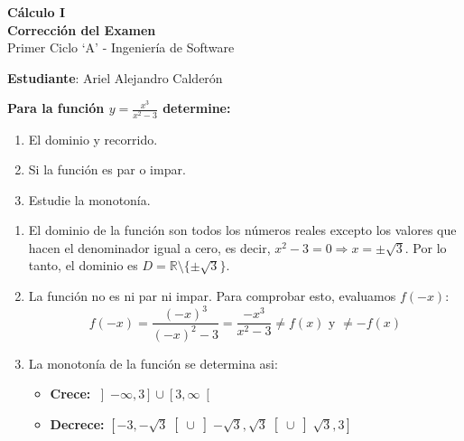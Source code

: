 \documentclass[answers]{exam}
\begin{document}
\begin{center}
	\Large\textbf{Cálculo I}\\[1em]
	\large\textbf{Corrección del Examen}\\[1em]
	\large Primer Ciclo \enquote*{A} - Ingeniería de Software\\[1em]
\end{center}

\vspace{0.5cm}
\large\textbf{Estudiante}: Ariel Alejandro Calderón
\vspace{0.5cm}

\begin{questions}

	\question \large\textbf{Para la función $\displaystyle y = \frac{x^3}{x^2 - 3} $ determine:}
	\begin{enumerate}[label=\alph*.]
		\item El dominio y recorrido.
		\item Si la función es par o impar.
		\item Estudie la monotonía.
	\end{enumerate}
	\begin{solution}
		\begin{enumerate}[label=\alph*.]
			\item El dominio de la función son todos los números reales excepto los valores que hacen el denominador igual a cero, es decir, $x^2 - 3 = 0 \Rightarrow x = \pm\sqrt{3}$. Por lo tanto, el dominio es $D = \mathbb{R} \setminus \{\pm\sqrt{3}\}$.

			\item La función no es ni par ni impar. Para comprobar esto, evaluamos $f(-x)$:
			      \[
				      f(-x) = \frac{(-x)^3}{(-x)^2 - 3} = \frac{-x^3}{x^2 - 3} \neq f(x) \text{ y } \neq -f(x)
			      \]

			\item La monotonía de la función se determina asi:
			      \begin{itemize}
				      \item \normalsize\textbf{Crece:} $\displaystyle
					            \left]-\infty, 3\right]\cup \left[3, \infty\right[
				            $
				      \item \normalsize\textbf{Decrece:} $\displaystyle
					            \left[-3, -\sqrt{3}\right[\cup \left]-\sqrt{3}, \sqrt{3}\right[\cup \left]\sqrt{3}, 3\right]
				            $
			      \end{itemize}
		\end{enumerate}
		\vspace{0.5cm}



\end{solution}
\end{questions}
\end{document}
